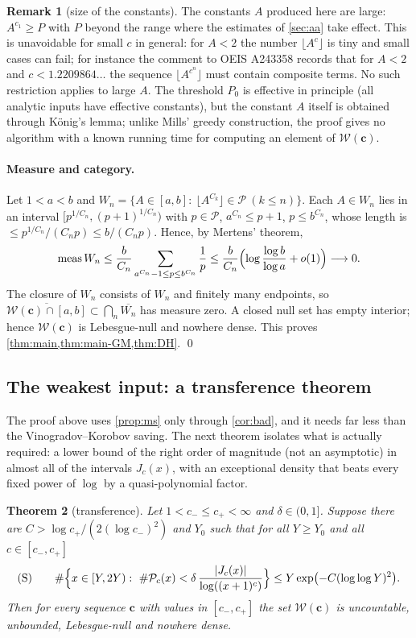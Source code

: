 \documentclass[11pt,a4paper]{article}
\newtheorem{theorem}{Theorem}[section]
\theoremstyle{definition}
\newtheorem{remark}[theorem]{Remark}
\newcommand{\PP}{\mathcal{P}}
\newcommand{\W}{\mathcal{W}}
\newcommand{\fl}[1]{\lfloor #1\rfloor}
\newcommand{\meas}{\operatorname{meas}}
\begin{document}
\begin{remark}[size of the constants]
The constants $A$ produced here are large: $A^{c_1}\ge P$ with $P$ beyond the range where the estimates of
\cref{sec:aa} take effect. This is unavoidable for small $c$ in general: for $A<2$ the number $\fl{A^{c}}$ is tiny
and small cases can fail; for instance the comment to OEIS A243358 \cite{OEIS243358} records that for $A<2$ and
$c<1.2209864\ldots$ the sequence $\fl{A^{c^n}}$ must contain composite terms. No such restriction applies to large $A$.
The threshold $P_0$ is effective in principle (all analytic inputs have effective constants), but the
constant $A$ itself is obtained through König's lemma; unlike Mills' greedy construction, the proof gives no
algorithm with a known running time for computing an element of $\W(\mathbf c)$.
\end{remark}

\paragraph{Measure and category.}
Let $1<a<b$ and $W_n=\{A\in[a,b]:\ \fl{A^{C_k}}\in\PP\ (k\le n)\}$. Each $A\in W_n$ lies in an interval
$[p^{1/C_n},(p+1)^{1/C_n})$ with $p\in\PP$, $a^{C_n}\le p+1$, $p\le b^{C_n}$, whose length is
$\le p^{1/C_n}/(C_np)\le b/(C_np)$. Hence, by Mertens' theorem,
\[
 \meas W_n\le\frac{b}{C_n}\sum_{a^{C_n}-1\le p\le b^{C_n}}\frac1p\le\frac{b}{C_n}\Bigl(\log\frac{\log b}{\log a}+o(1)\Bigr)\longrightarrow0 .
\]
The closure of $W_n$ consists of $W_n$ and finitely many endpoints, so
$\overline{\W(\mathbf c)\cap[a,b]}\subset\bigcap_n\overline{W_n}$ has measure zero. A closed null set has empty
interior; hence $\W(\mathbf c)$ is Lebesgue-null and nowhere dense. This proves
\cref{thm:main,thm:main-GM,thm:DH}. \qed

\subsection{The weakest input: a transference theorem}
The proof above uses \cref{prop:ms} only through \cref{cor:bad}, and it needs far less than the
Vinogradov--Korobov saving. The next theorem isolates what is actually required: a lower bound of the right
order of magnitude (not an asymptotic) in almost all of the intervals $J_c(x)$, with an exceptional density
that beats every fixed power of $\log$ by a quasi-polynomial factor.

\begin{theorem}[transference]\label{thm:transfer}
Let $1<c_-\le c_+<\infty$ and $\delta\in(0,1]$. Suppose there are $C>\log c_+/(2(\log c_-)^2)$ and $Y_0$ such that
for all $Y\ge Y_0$ and all $c\in[c_-,c_+]$
\[
 \text{(S)}\qquad \#\Bigl\{x\in[Y,2Y):\ \#\PP_c(x)<\delta\,\frac{|J_c(x)|}{\log((x+1)^c)}\Bigr\}\le Y\exp\bigl(-C(\log\log Y)^2\bigr).
\]
Then for every sequence $\mathbf c$ with values in $[c_-,c_+]$ the set $\W(\mathbf c)$ is uncountable, unbounded,
Lebesgue-null and nowhere dense.
\end{theorem}
\end{document}
